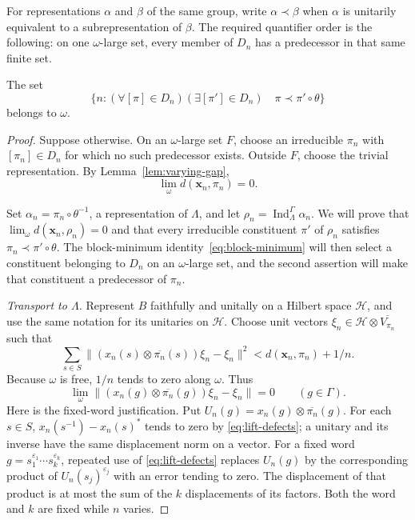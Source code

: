 For representations $\alpha$ and $\beta$ of the same group, write
$\alpha\prec\beta$ when $\alpha$ is unitarily equivalent to a
subrepresentation of $\beta$.  The required quantifier order is the
following: on one $\omega$-large set, every member of $D_n$ has a
predecessor in that same finite set.

\begin{lemma}\label{lem:uniform-predecessor}
The set
\[
 \{n:(\forall[\pi]\in D_n)(\exists[\pi']\in D_n)
 \quad\pi\prec\pi'\circ\theta\}
\]
belongs to $\omega$.
\end{lemma}

\begin{proof}
Suppose otherwise.  On an $\omega$-large set $F$, choose an
irreducible $\pi_n$ with $[\pi_n]\in D_n$ for which no such predecessor
exists.  Outside $F$, choose the trivial representation.  By
Lemma~\ref{lem:varying-gap},
\begin{equation}
 \lim_\omega d(\mathbf x_n,\pi_n)=0.
 \label{eq:chosen-zero}
\end{equation}

Set $\alpha_n=\pi_n\circ\theta^{-1}$, a representation of $\Lambda$,
and let $\rho_n=\operatorname{Ind}_{\Lambda}^{\Gamma}\alpha_n$.
We will prove that $\lim_\omega d(\mathbf x_n,\rho_n)=0$ and that
every irreducible constituent $\pi'$ of $\rho_n$ satisfies
$\pi_n\prec\pi'\circ\theta$.
The block-minimum identity~\eqref{eq:block-minimum} will then select a
constituent belonging to $D_n$ on an $\omega$-large set, and the second
assertion will make that constituent a predecessor of $\pi_n$.

\emph{Transport to $\Lambda$.}
Represent $B$ faithfully and unitally on a Hilbert space $\mathcal H$,
and use the same notation for its unitaries on $\mathcal H$.  Choose
unit vectors $\xi_n\in\mathcal H\otimes\overline{V_{\pi_n}}$ such that
\[
 \sum_{s\in S}
 \|(x_n(s)\otimes\overline{\pi_n}(s))\xi_n-\xi_n\|^2
 <d(\mathbf x_n,\pi_n)+1/n.
\]
Because $\omega$ is free, $1/n$ tends to zero along $\omega$.  Thus
\begin{equation}
 \lim_\omega
 \|(x_n(g)\otimes\overline{\pi_n}(g))\xi_n-\xi_n\|=0
 \qquad(g\in\Gamma).
 \label{eq:fixed-word-invariance}
\end{equation}
Here is the fixed-word justification.  Put
$U_n(g)=x_n(g)\otimes\overline{\pi_n}(g)$.  For each $s\in S$,
$x_n(s^{-1})-x_n(s)^*$ tends to zero by
\eqref{eq:lift-defects}; a unitary and its inverse have the same
displacement norm on a vector.  For a fixed word
$g=s_1^{\varepsilon_1}\cdots s_k^{\varepsilon_k}$, repeated use of
\eqref{eq:lift-defects} replaces $U_n(g)$ by the corresponding product
of $U_n(s_j)^{\varepsilon_j}$ with an error tending to zero.
The displacement of that product is
at most the sum of the $k$ displacements of its factors.  Both the
word and $k$ are fixed while $n$ varies.


\end{proof}
